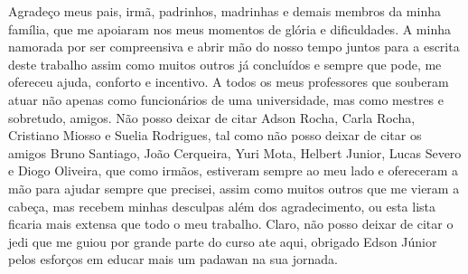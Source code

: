 \begin{agradecimentos}


Agradeço meus pais, irmã, padrinhos, madrinhas e demais membros da minha família, que me apoiaram  nos meus momentos de glória e dificuldades. A minha namorada por ser compreensiva e abrir mão do nosso tempo juntos para a escrita deste trabalho assim como muitos outros já concluídos e sempre que pode, me ofereceu ajuda, conforto e incentivo. A todos os meus professores que souberam atuar não apenas como funcionários de uma universidade, mas como mestres e sobretudo, amigos. Não posso deixar de citar Adson Rocha, Carla Rocha, Cristiano Miosso e Suelia Rodrigues, tal como não posso deixar de citar os amigos Bruno Santiago, João Cerqueira, Yuri Mota, Helbert Junior, Lucas Severo e Diogo Oliveira, que como irmãos, estiveram sempre ao meu lado e ofereceram a mão para ajudar sempre que precisei, assim como muitos outros que me vieram a cabeça, mas recebem minhas desculpas além dos agradecimento, ou esta lista ficaria mais extensa que todo o meu trabalho. Claro, não posso deixar de citar o jedi que me guiou por grande parte do curso ate aqui, obrigado Edson Júnior pelos esforços em educar mais um padawan na sua jornada.

\end{agradecimentos}
